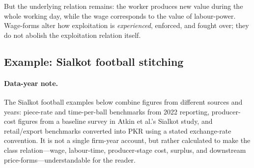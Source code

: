 But the underlying relation remains: the worker produces new value during the whole
working day, while the wage corresponds to the value of labour-power. Wage-forms alter
how exploitation is \emph{experienced}, enforced, and fought over; they do not abolish
the exploitation relation itself.

\subsection{Example: Sialkot football stitching}
\label{subsec:sialkot-football-stitching}

\paragraph{Data-year note.}
The Sialkot football examples below combine figures from different sources and
years: piece-rate and time-per-ball benchmarks from 2022 reporting, producer-cost
figures from a baseline survey in 
Atkin et al.'s Sialkot study, and retail/export
benchmarks converted into PKR using a stated exchange-rate convention. It is not a
single firm-year account, but rather calculated to make the class
relation---wage, labour-time, producer-stage cost, surplus, and downstream
price-forms---understandable for the reader.

